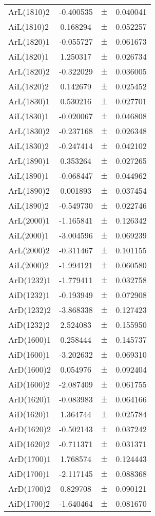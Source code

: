 \begin{table}
\begin{tiny}
\begin{tabular}{lccc}
ArL(1810)2 & -0.400535 & $\pm$ & 0.040041 \\
AiL(1810)2 & 0.168294 & $\pm$ & 0.052257 \\
ArL(1820)1 & -0.055727 & $\pm$ & 0.061673 \\
AiL(1820)1 & 1.250317 & $\pm$ & 0.026734 \\
ArL(1820)2 & -0.322029 & $\pm$ & 0.036005 \\
AiL(1820)2 & 0.142679 & $\pm$ & 0.025452 \\
ArL(1830)1 & 0.530216 & $\pm$ & 0.027701 \\
AiL(1830)1 & -0.020067 & $\pm$ & 0.046808 \\
ArL(1830)2 & -0.237168 & $\pm$ & 0.026348 \\
AiL(1830)2 & -0.247414 & $\pm$ & 0.042102 \\
ArL(1890)1 & 0.353264 & $\pm$ & 0.027265 \\
AiL(1890)1 & -0.068447 & $\pm$ & 0.044962 \\
ArL(1890)2 & 0.001893 & $\pm$ & 0.037454 \\
AiL(1890)2 & -0.549730 & $\pm$ & 0.022746 \\
ArL(2000)1 & -1.165841 & $\pm$ & 0.126342 \\
AiL(2000)1 & -3.004596 & $\pm$ & 0.069239 \\
ArL(2000)2 & -0.311467 & $\pm$ & 0.101155 \\
AiL(2000)2 & -1.994121 & $\pm$ & 0.060580 \\
ArD(1232)1 & -1.779411 & $\pm$ & 0.032758 \\
AiD(1232)1 & -0.193949 & $\pm$ & 0.072908 \\
ArD(1232)2 & -3.868338 & $\pm$ & 0.127423 \\
AiD(1232)2 & 2.524083 & $\pm$ & 0.155950 \\
ArD(1600)1 & 0.258444 & $\pm$ & 0.145737 \\
AiD(1600)1 & -3.202632 & $\pm$ & 0.069310 \\
ArD(1600)2 & 0.054976 & $\pm$ & 0.092404 \\
AiD(1600)2 & -2.087409 & $\pm$ & 0.061755 \\
ArD(1620)1 & -0.083983 & $\pm$ & 0.064166 \\
AiD(1620)1 & 1.364744 & $\pm$ & 0.025784 \\
ArD(1620)2 & -0.502143 & $\pm$ & 0.037242 \\
AiD(1620)2 & -0.711371 & $\pm$ & 0.031371 \\
ArD(1700)1 & 1.768574 & $\pm$ & 0.124443 \\
AiD(1700)1 & -2.117145 & $\pm$ & 0.088368 \\
ArD(1700)2 & 0.829708 & $\pm$ & 0.090121 \\
AiD(1700)2 & -1.640464 & $\pm$ & 0.081670 \\
\bottomrule
\end{tabular}
\end{tiny}
\end{table}

